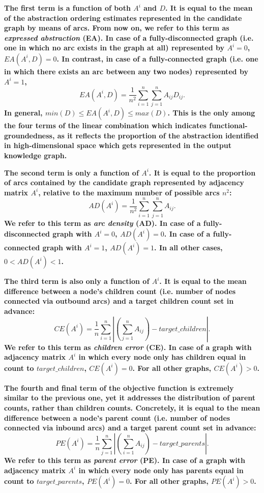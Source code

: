 \textbf{The first term is a function of both $A^i$ and $D$. It is equal to the mean of the abstraction ordering estimates represented in the candidate graph by means of arcs. From now on, we refer to this term as \textit{expressed abstraction} (EA). In case of a fully-disconnected graph (i.e. one in which no arc exists in the graph at all) represented by $A^i = 0$, $EA(A^i, D) = 0$. In contrast, in case of a fully-connected graph (i.e. one in which there exists an arc between any two nodes) represented by $A^i = 1$, $$EA(A^i, D) = \frac{1}{n^2} \sum_{i=1}^{n} \sum_{j=1}^{n} A_{ij} D_{ij}.$$ In general, $min(D) \leq EA(A^i, D) \leq max(D)$. This is the only among the four terms of the linear combination which indicates functional-groundedness, as it reflects the proportion of the abstraction identified in high-dimensional space which gets represented in the output knowledge graph.}

\textbf{The second term is only a function of $A^i$. It is equal to the proportion of arcs contained by the candidate graph represented by adjacency matrix $A^i$, relative to the maximum number of possible arcs $n^2$: $$AD(A^i) = \frac{1}{n^2} \sum_{i=1}^{n} \sum_{j=1}^{n} A_{ij}.$$ We refer to this term as \textit{arc density} (AD). In case of a fully-disconnected graph with $A^i = 0$, $AD(A^i) = 0$. In case of a fully-connected graph with $A^i = 1$, $AD(A^i) = 1$. In all other cases, $0 < AD(A^i) < 1$.}

\textbf{The third term is also only a function of $A^i$. It is equal to the mean difference between a node's children count (i.e. number of nodes connected via outbound arcs) and a target children count set in advance: $$CE(A^i) = \frac{1}{n} \sum_{i=1}^{n} \left|(\sum_{j=1}^{n}A_{ij}) - target\_children\right|.$$ We refer to this term as \textit{children error} (CE). In case of a graph with adjacency matrix $A^i$ in which every node only has children equal in count to $target\_children$, $CE(A^i)=0$. For all other graphs, $CE(A^i) > 0$.}

\textbf{The fourth and final term of the objective function is extremely similar to the previous one, yet it addresses the distribution of parent counts, rather than children counts. Concretely, it is equal to the mean difference between a node's parent count (i.e. number of nodes connected via inbound arcs) and a target parent count set in advance: $$PE(A^i) = \frac{1}{n} \sum_{j=1}^{n} \left|(\sum_{i=1}^{n}A_{ij}) - target\_parents\right|.$$ We refer to this term as \textit{parent error} (PE). In case of a graph with adjacency matrix $A^i$ in which every node only has parents equal in count to $target\_parents$, $PE(A^i)=0$. For all other graphs, $PE(A^i) > 0$.}

